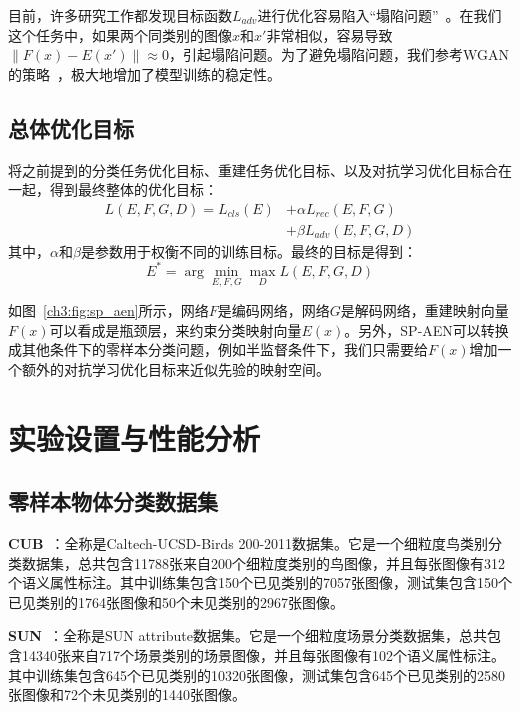 目前，许多研究工作都发现目标函数$L_{adv}$进行优化容易陷入“塌陷问题”~\cite{arjovsky2017wasserstein}。在我们这个任务中，如果两个同类别的图像$x$和$x'$非常相似，容易导致$\|F(x)-E(x')\|\approx 0$，引起塌陷问题。为了避免塌陷问题，我们参考WGAN的策略~\cite{arjovsky2017wasserstein}，极大地增加了模型训练的稳定性。


\subsection{总体优化目标}
将之前提到的分类任务优化目标、重建任务优化目标、以及对抗学习优化目标合在一起，得到最终整体的优化目标：
\begin{equation}\label{ch3:eq:eq_5}
\begin{split}
L (E, F, G, D) = L_{cls}(E) &+ \alpha L_{rec} (E, F, G) \\
&+ \beta L_{adv}(E, F, G, D)
\end{split}
\end{equation}
其中，$\alpha$和$\beta$是参数用于权衡不同的训练目标。最终的目标是得到：
\begin{equation}\label{ch3:eq:eq_6}
E^* = \arg\min\limits_{E, F, G}\max\limits_{D} L(E, F, G, D)
\end{equation}

如图~\ref{ch3:fig:sp_aen}所示，网络$F$是编码网络，网络$G$是解码网络，重建映射向量$F(x)$可以看成是瓶颈层，来约束分类映射向量$E(x)$。另外，SP-AEN可以转换成其他条件下的零样本分类问题，例如半监督条件下，我们只需要给$F(x)$增加一个额外的对抗学习优化目标来近似先验的映射空间。



\section{实验设置与性能分析}
\subsection{零样本物体分类数据集}
\textbf{CUB}~\cite{wah2011caltech}：全称是Caltech-UCSD-Birds 200-2011数据集。它是一个细粒度鸟类别分类数据集，总共包含11788张来自200个细粒度类别的鸟图像，并且每张图像有312个语义属性标注。其中训练集包含150个已见类别的7057张图像，测试集包含150个已见类别的1764张图像和50个未见类别的2967张图像。

\textbf{SUN}~\cite{patterson2012sun}：全称是SUN attribute数据集。它是一个细粒度场景分类数据集，总共包含14340张来自717个场景类别的场景图像，并且每张图像有102个语义属性标注。其中训练集包含645个已见类别的10320张图像，测试集包含645个已见类别的2580张图像和72个未见类别的1440张图像。

